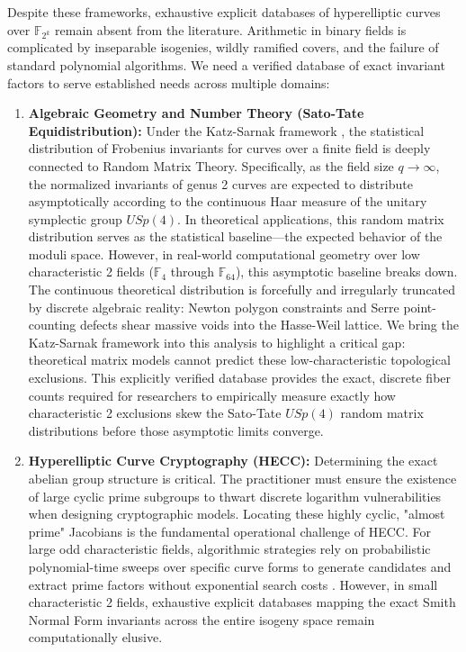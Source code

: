 \documentclass[letterpaper, 11pt]{article}
\begin{document}
Despite these frameworks, exhaustive explicit databases of hyperelliptic curves over $\mathbb{F}_{2^k}$ remain absent from the literature. Arithmetic in binary fields is complicated by inseparable isogenies, wildly ramified covers, and the failure of standard polynomial algorithms. We need a verified database of exact invariant factors to serve established needs across multiple domains:
\begin{enumerate}
    \item \textbf{Algebraic Geometry and Number Theory (Sato-Tate Equidistribution):} Under the Katz-Sarnak framework \cite{Katz1999}, the statistical distribution of Frobenius invariants for curves over a finite field is deeply connected to Random Matrix Theory. Specifically, as the field size $q \to \infty$, the normalized invariants of genus 2 curves are expected to distribute asymptotically according to the continuous Haar measure of the unitary symplectic group $USp(4)$. In theoretical applications, this random matrix distribution serves as the statistical baseline—the expected behavior of the moduli space. However, in real-world computational geometry over low characteristic 2 fields ($\mathbb{F}_4$ through $\mathbb{F}_{64}$), this asymptotic baseline breaks down. The continuous theoretical distribution is forcefully and irregularly truncated by discrete algebraic reality: Newton polygon constraints and Serre point-counting defects shear massive voids into the Hasse-Weil lattice. We bring the Katz-Sarnak framework into this analysis to highlight a critical gap: theoretical matrix models cannot predict these low-characteristic topological exclusions. This explicitly verified database provides the exact, discrete fiber counts required for researchers to empirically measure exactly how characteristic 2 exclusions skew the Sato-Tate $USp(4)$ random matrix distributions before those asymptotic limits converge.
    \item \textbf{Hyperelliptic Curve Cryptography (HECC):} Determining the exact abelian group structure is critical. The practitioner must ensure the existence of large cyclic prime subgroups to thwart discrete logarithm vulnerabilities when designing cryptographic models. Locating these highly cyclic, "almost prime" Jacobians is the fundamental operational challenge of HECC. For large odd characteristic fields, algorithmic strategies rely on probabilistic polynomial-time sweeps over specific curve forms to generate candidates and extract prime factors without exponential search costs \cite{Satoh2008}. However, in small characteristic 2 fields, exhaustive explicit databases mapping the exact Smith Normal Form invariants across the entire isogeny space remain computationally elusive.
\end{enumerate}
\end{document}
